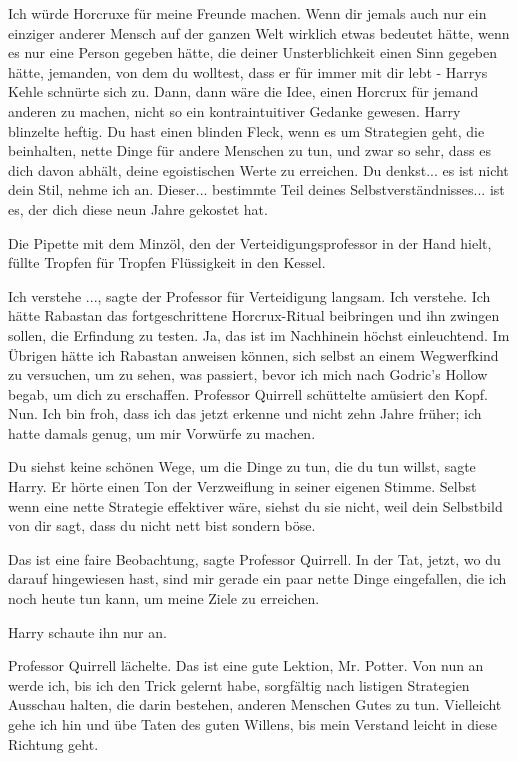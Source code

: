 \glqq{}Ich würde Horcruxe für meine Freunde machen. Wenn dir jemals auch nur ein
einziger anderer Mensch auf der ganzen Welt wirklich etwas bedeutet hätte, wenn
es nur eine Person gegeben hätte, die deiner Unsterblichkeit einen Sinn gegeben
hätte, jemanden, von dem du wolltest, dass er für immer mit dir lebt -\grqq{} Harrys
Kehle schnürte sich zu. \glqq{}Dann, dann wäre die Idee, einen Horcrux für jemand
anderen zu machen, nicht so ein kontraintuitiver Gedanke gewesen.\grqq{} Harry
blinzelte heftig. \glqq{}Du hast einen blinden Fleck, wenn es um Strategien geht,
die beinhalten, nette Dinge für andere Menschen zu tun, und zwar so sehr, dass
es dich davon abhält, deine egoistischen Werte zu erreichen. Du denkst... es ist
nicht dein Stil, nehme ich an. Dieser... bestimmte Teil deines
Selbstverständnisses... ist es, der dich diese neun Jahre gekostet hat.\grqq{}

Die Pipette mit dem Minzöl, den der Verteidigungsprofessor in der Hand hielt,
füllte Tropfen für Tropfen Flüssigkeit in den Kessel.

\glqq{}Ich verstehe ...\grqq{}, sagte der Professor für Verteidigung langsam.
\glqq{}Ich verstehe. Ich hätte Rabastan das fortgeschrittene Horcrux-Ritual
beibringen und ihn zwingen sollen, die Erfindung zu testen. Ja, das ist im
Nachhinein höchst einleuchtend. Im Übrigen hätte ich Rabastan anweisen können,
sich selbst an einem Wegwerfkind zu versuchen, um zu sehen, was passiert, bevor
ich mich nach Godric's Hollow begab, um dich zu erschaffen.\grqq{} Professor Quirrell
schüttelte amüsiert den Kopf. \glqq{}Nun. Ich bin froh, dass ich das jetzt
erkenne und nicht zehn Jahre früher; ich hatte damals genug, um mir Vorwürfe zu
machen.\grqq{}

\glqq{}Du siehst keine schönen Wege, um die Dinge zu tun, die du tun
willst\grqq{}, sagte Harry. Er hörte einen Ton der Verzweiflung in seiner
eigenen Stimme. \glqq{}Selbst wenn eine nette Strategie effektiver wäre, siehst
du sie nicht, weil dein Selbstbild von dir sagt, dass du nicht nett bist sondern
böse.\grqq{}

\glqq{}Das ist eine faire Beobachtung\grqq{}, sagte Professor Quirrell. \glqq{}In
der Tat, jetzt, wo du darauf hingewiesen hast, sind mir gerade ein paar nette
Dinge eingefallen, die ich noch heute tun kann, um meine Ziele zu erreichen.\grqq{}

Harry schaute ihn nur an.

Professor Quirrell lächelte. \glqq{}Das ist eine gute Lektion, Mr. Potter. Von
nun an werde ich, bis ich den Trick gelernt habe, sorgfältig nach listigen
Strategien Ausschau halten, die darin bestehen, anderen Menschen Gutes zu tun.
Vielleicht gehe ich hin und übe Taten des guten Willens, bis mein Verstand
leicht in diese Richtung geht.\grqq{}

